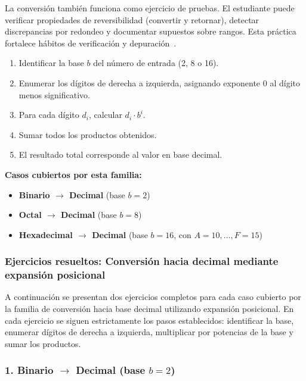 \documentclass[12pt,twoside]{book}
\begin{document}
						La conversión también funciona como ejercicio de pruebas. El estudiante puede verificar propiedades de reversibilidad (convertir y retornar), detectar discrepancias por redondeo y documentar supuestos sobre rangos. Esta práctica fortalece hábitos de verificación y depuración~\cite{Ghezzi2003Fundamentals,Pressman2019Software,Hanly2015Problem}.
						
						\begin{enumerate}
							\item Identificar la base $b$ del número de entrada (2, 8 o 16).
							\item Enumerar los dígitos de derecha a izquierda, asignando exponente $0$ al dígito menos significativo.
							\item Para cada dígito $d_i$, calcular $d_i \cdot b^i$.
							\item Sumar todos los productos obtenidos.
							\item El resultado total corresponde al valor en base decimal.
						\end{enumerate}
						
						\textbf{Casos cubiertos por esta familia:}
						\begin{itemize}
							\item \textbf{Binario $\rightarrow$ Decimal} (base $b=2$)
							\item \textbf{Octal $\rightarrow$ Decimal} (base $b=8$)
							\item \textbf{Hexadecimal $\rightarrow$ Decimal} (base $b=16$, con $A=10,\dots,F=15$)
						\end{itemize}
						
						\subsubsection*{Ejercicios resueltos: Conversión hacia decimal mediante expansión posicional}
						
						\noindent
						A continuación se presentan dos ejercicios completos para cada caso cubierto por la familia de conversión hacia base decimal utilizando expansión posicional. En cada ejercicio se siguen estrictamente los pasos establecidos: identificar la base, enumerar dígitos de derecha a izquierda, multiplicar por potencias de la base y sumar los productos.
						
						\subsubsection*{1. Binario $\rightarrow$ Decimal (base $b=2$)}
						
\end{document}
